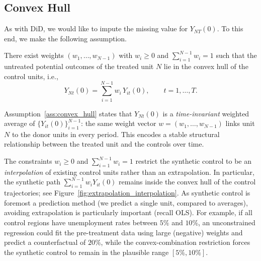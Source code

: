 \documentclass[11pt]{exam}
\begin{document}
\subsection{Convex Hull}
As with DiD, we would like to impute the missing value for $Y_{NT}(0)$. To this end, we make the following assumption.
\begin{assumption}\label{ass:convex_hull}
There exist weights $(w_1,\dots,w_{N-1})$ with $w_i \ge 0$ and
$\sum_{i=1}^{N-1} w_i = 1$ such that the untreated potential outcomes of
the treated unit $N$ lie in the convex hull of the control units, i.e., 
\[
  Y_{Nt}(0) = \sum_{i=1}^{N-1} w_i\, Y_{it}(0),
  \qquad t = 1,\ldots,T.
\]
\end{assumption}
Assumption~\ref{ass:convex_hull} states that $Y_{Nt}(0)$ is a \emph{time-invariant}
weighted average of $\{Y_{it}(0)\}_{i=1}^{N-1}$: the same weight vector
$w = (w_1,\dots,w_{N-1})$ links unit $N$ to the donor units in every period.
This encodes a stable structural relationship between the treated unit and the
controls over time.

The constraints $w_i \ge 0$ and $\sum_{i=1}^{N-1} w_i = 1$ restrict the
synthetic control to be an \emph{interpolation} of existing control units
rather than an extrapolation. In particular, the synthetic path
$\sum_{i=1}^{N-1} w_i Y_{it}(0)$ remains inside the convex hull of the control
trajectories; see Figure~\ref{fig:extrapolation_interpolation}. As synthetic control is foremost a prediction method (we predict a single unit, compared to averages), avoiding extrapolation is particularly important (recall OLS). For example, if all control regions have unemployment rates between $5\%$ and $10\%$, an unconstrained regression could fit the pre-treatment data using large
(negative) weights and predict a counterfactual of $20\%$, while the convex-combination restriction forces the synthetic control to remain in the plausible range $[5\%,10\%]$.
\end{document}
